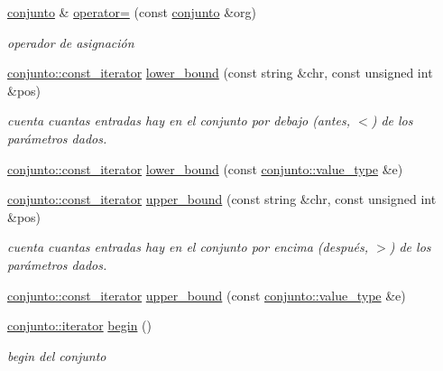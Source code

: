 \begin{DoxyCompactItemize}
\hyperlink{classconjunto}{conjunto} \& \hyperlink{classconjunto_a2bdce402a4b76117b68fe71c0dffab87}{operator=} (const \hyperlink{classconjunto}{conjunto} \&org)
\begin{DoxyCompactList}\small\item\em operador de asignación \end{DoxyCompactList}\item 
\hyperlink{classconjunto_aa3cf9f1ee3fc1682b221c33d9f271e2e}{conjunto\+::const\+\_\+iterator} \hyperlink{classconjunto_a56fe153b3a546c63493ee027bcf3c7cb}{lower\+\_\+bound} (const string \&chr, const unsigned int \&pos)
\begin{DoxyCompactList}\small\item\em cuenta cuantas entradas hay en el conjunto por debajo (\textquotesingle{}antes\textquotesingle{}, \textquotesingle{}$<$\textquotesingle{}) de los parámetros dados. \end{DoxyCompactList}\item 
\hyperlink{classconjunto_aa3cf9f1ee3fc1682b221c33d9f271e2e}{conjunto\+::const\+\_\+iterator} \hyperlink{classconjunto_a12c246fa72986d7d4b9f58ad33594022}{lower\+\_\+bound} (const \hyperlink{classconjunto_ad902faf0206fe6aa37e39d8e6e5a880a}{conjunto\+::value\+\_\+type} \&e)
\item 
\hyperlink{classconjunto_aa3cf9f1ee3fc1682b221c33d9f271e2e}{conjunto\+::const\+\_\+iterator} \hyperlink{classconjunto_ac6f8693ddce1a58425c05a71e5a6f450}{upper\+\_\+bound} (const string \&chr, const unsigned int \&pos)
\begin{DoxyCompactList}\small\item\em cuenta cuantas entradas hay en el conjunto por encima (\textquotesingle{}después\textquotesingle{}, \textquotesingle{}$>$\textquotesingle{}) de los parámetros dados. \end{DoxyCompactList}\item 
\hyperlink{classconjunto_aa3cf9f1ee3fc1682b221c33d9f271e2e}{conjunto\+::const\+\_\+iterator} \hyperlink{classconjunto_a8b0f19b9e37fe5ee0831c34e36f943e5}{upper\+\_\+bound} (const \hyperlink{classconjunto_ad902faf0206fe6aa37e39d8e6e5a880a}{conjunto\+::value\+\_\+type} \&e)
\item 
\hyperlink{classconjunto_a6de33afebdfa3ec058e9c78f28854311}{conjunto\+::iterator} \hyperlink{classconjunto_af90b2324c2675dd4751a79f2e2ad8277}{begin} ()
\begin{DoxyCompactList}\small\item\em begin del conjunto \end{DoxyCompactList}\item 

\end{DoxyCompactItemize}
